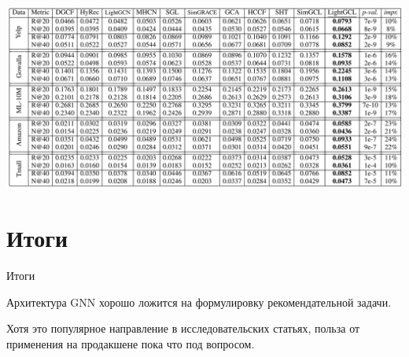 \documentclass[11pt,aspectratio=169,handout]{beamer}
\begin{document}
\begin{frame}
 
\begin{center}
\includegraphics[scale=0.3]{images/lightgcl-exp.png}
\end{center}

\end{frame}

\section{Итоги}

\begin{frame}{Итоги}

\begin{tcolorbox}[colback=info!5,colframe=info!80,title=]
Архитектура GNN хорошо ложится на формулировку рекомендательной задачи.
\end{tcolorbox}

\begin{tcolorbox}[colback=warn!5,colframe=warn!80,title=]
Хотя это популярное направление в исследовательских статьях, польза от применения на продакшене пока что под вопросом.
\end{tcolorbox}

\end{frame}
\end{document}
